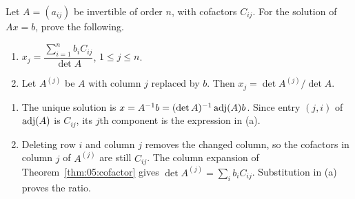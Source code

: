 \begin{problem}\label{ex:05:cramer}
Let \(A=(a_{ij})\) be invertible of order \(n\), with cofactors \(C_{ij}\).
For the solution of \(Ax=b\), prove the following.
\begin{enumerate}
\item \(x_j=\dfrac{\sum_{i=1}^n b_iC_{ij}}{\det A}\), \(1\leqslant j\leqslant n\).
\item Let \(A^{(j)}\) be \(A\) with column \(j\) replaced by \(b\).
Then \(x_j=\det A^{(j)}/\det A\).
\end{enumerate}
\end{problem}
\begin{solution}
\begin{enumerate}
\item The unique solution is
\(x=A^{-1}b=(\det A)^{-1}\operatorname{adj}(A)b\).
Since entry \((j,i)\) of \(\operatorname{adj}(A)\) is \(C_{ij}\), its \(j\)th component
is the expression in (a).
\item Deleting row \(i\) and column \(j\) removes the changed column,
so the cofactors in column \(j\) of \(A^{(j)}\) are still \(C_{ij}\).
The column expansion of Theorem~\ref{thm:05:cofactor} gives
\(\det A^{(j)}=\sum_i b_iC_{ij}\).
Substitution in (a) proves the ratio.
\end{enumerate}
\end{solution}

